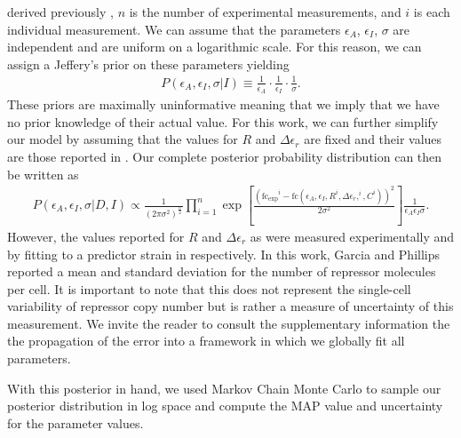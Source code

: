  derived previously , $n$ is the number of
experimental measurements, and $i$ is each individual measurement. We can
assume that the parameters $\epsilon_A$, $\epsilon_I$, $\sigma$ are independent
and are uniform on a logarithmic scale. For this reason, we can assign a
Jeffery's prior on these parameters yielding \begin{align} P(\epsilon_A,
\epsilon_I, \sigma \vert I) \equiv
\frac{1}{\epsilon_A}\cdot\frac{1}{\epsilon_I}\cdot\frac{1}{\sigma}. \end{align}
These priors are maximally uninformative meaning that we imply that we have no
prior knowledge of their actual value. For this work, we can further simplify
our model by assuming that the values for $R$ and $\Delta\epsilon_r$ are fixed
and their values are those reported in \cite{Garcia2011}. Our complete
posterior probability distribution can then be written as
\begin{align}
P(\epsilon_A, \epsilon_I, \sigma \vert D, I) \propto
\frac{1}{(2\pi\sigma^2)^\frac{n}{2}}\prod\limits_{i =
1}^n\exp\left[\frac{(\mathrm{fc_{exp}}^i - \mathrm{fc}(\epsilon_A, \epsilon_I,
R^i, \Delta\epsilon_r,^i,
C^i))^2}{2\sigma^2}\right]\frac{1}{\epsilon_A\epsilon_I\sigma}.
\end{align}
However, the values reported for $R$ and $\Delta\epsilon_r$ as were measured
experimentally and by fitting to a predictor strain in  \cite{Garcia2011}
respectively. In this work, Garcia and Phillips reported a mean and standard
deviation for the number of repressor molecules per cell. It is important to
note that this does not represent the single-cell variability of repressor copy
number but is rather a measure of uncertainty of this measurement. We invite
the reader to consult the supplementary information the the propagation of the
error into a framework in which we globally fit all parameters.

With this posterior in hand, we used Markov Chain Monte Carlo to sample our
posterior distribution in log space and compute the MAP value and uncertainty
for the parameter values. 

